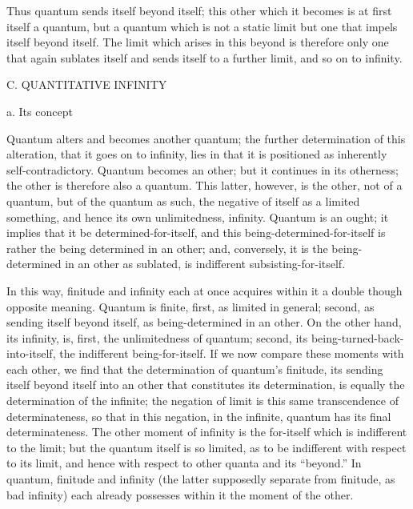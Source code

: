 Thus quantum sends itself beyond itself;
this other which it becomes is at first itself a quantum,
but a quantum which is not a static limit
but one that impels itself beyond itself.
The limit which arises in this beyond is
therefore only one that again sublates itself
and sends itself to a further limit,
and so on to infinity.

C. QUANTITATIVE INFINITY

a. Its concept

Quantum alters and becomes another quantum;
the further determination of this alteration,
that it goes on to infinity,
lies in that it is positioned as
inherently self-contradictory.
Quantum becomes an other;
but it continues in its otherness;
the other is therefore also a quantum.
This latter, however, is the other,
not of a quantum, but of the quantum as such,
the negative of itself as a limited something,
and hence its own unlimitedness, infinity.
Quantum is an ought; it implies that it be determined-for-itself,
and this being-determined-for-itself is rather
the being determined in an other;
and, conversely, it is the being-determined in
an other as sublated, is indifferent subsisting-for-itself.

In this way, finitude and infinity each at once acquires
within it a double though opposite meaning.
Quantum is finite, first, as limited in general;
second, as sending itself beyond itself,
as being-determined in an other.
On the other hand, its infinity, is,
first, the unlimitedness of quantum;
second, its being-turned-back-into-itself,
the indifferent being-for-itself.
If we now compare these moments with each other,
we find that the determination of quantum's finitude,
its sending itself beyond itself into an other
that constitutes its determination,
is equally the determination of the infinite;
the negation of limit is this
same transcendence of determinateness,
so that in this negation, in the infinite,
quantum has its final determinateness.
The other moment of infinity is the for-itself
which is indifferent to the limit;
but the quantum itself is so limited,
as to be indifferent with respect to its limit,
and hence with respect to other quanta and its “beyond.”
In quantum, finitude and infinity
(the latter supposedly separate from finitude, as bad infinity)
each already possesses within it the moment of the other.

